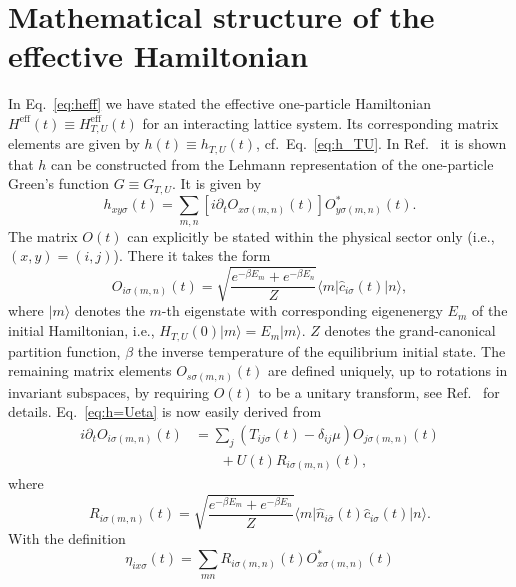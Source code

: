 \documentclass[twocolumn,prb,showpacs,aps,superscriptaddress]{revtex4}
\newcommand{\cc}[1]{\ensuremath{\hat{c}_{#1}}}
\newcommand{\lwf}[1]{\ensuremath{\langle #1 \vert}}
\newcommand{\rwf}[1]{\ensuremath{\vert #1 \rangle}}
\begin{document}
\section{Mathematical structure of the effective Hamiltonian}
\label{ap:math_eff}

In Eq.\ \eqref{eq:heff} we have stated the effective one-particle Hamiltonian
$H^\mathrm{eff}(t) \equiv H^\mathrm{eff}_{T,U}(t)$ for an interacting lattice
system. Its corresponding matrix elements are given by $h(t) \equiv
h_{T,U}(t)$, cf.\  Eq.\ \eqref{eq:h_TU}. In Ref.\  it is shown
that $h$ can be constructed from the Lehmann representation of the
one-particle Green's function $G\equiv G_{T,U}$. It is given by
\begin{equation}
  h_{xy\sigma}(t)
  = 
  \sum_{m,n} [i\partial_ t O_{x\sigma (m,n)}(t)] O^*_{y\sigma (m,n)}(t).
\end{equation}
The matrix $O(t)$ can explicitly be stated within the physical sector only
(i.e., $(x,y) = (i,j)$). There it takes the form
\begin{equation}
  \label{eq:defO}
	O_{i\sigma(m,n)}(t) 
  =
  \sqrt{\frac{e^{-\beta E_m}+e^{-\beta E_n}}{Z}} 
  \lwf{m}\cc{i\sigma}(t)\rwf{n},
\end{equation}
where $\rwf{m}$ denotes the $m$-th eigenstate with corresponding eigenenergy
$E_m$ of the initial Hamiltonian, i.e., $H_{T, U}(0)\rwf{m} =
E_m \rwf{m}$. $Z$ denotes the grand-canonical partition function, $\beta$ the
inverse temperature of the equilibrium initial state. The remaining matrix
elements $O_{s\sigma (m,n)}(t)$ are defined uniquely, up to rotations in
invariant subspaces, by requiring $O(t)$ to be a unitary transform, see Ref.\ 
 for details. Eq.\ \eqref{eq:h=Ueta} is now easily derived
from
\begin{align}
  \label{ap:dtO}
  i\partial_t O_{i\sigma(m,n)}(t)
  &= 
  \sum_{j}
  \left(
    T_{ij\sigma}(t)-\delta_{ij}\mu
  \right)
  O_{j\sigma(m,n)}(t)\\
  &\phantom{=}\,\,\,+
  U(t) R_{i\sigma(m,n)}(t),\nonumber
\end{align}
where
\begin{equation}
  R_{i\sigma(m,n)}(t)
  =
  \sqrt{\frac{e^{-\beta E_m}+e^{-\beta E_n}}{Z}} 
  \lwf{m}\hat{n}_{i\bar\sigma}(t)\cc{i\sigma}(t)\rwf{n}.
\end{equation}
With the definition
\begin{equation}
  \label{eq:ldef}
  \eta_{ix \sigma}(t) = \sum_{mn} R_{i\sigma (m,n)}(t) O_{x\sigma(m,n)}^*(t)
\end{equation}
\end{document}
